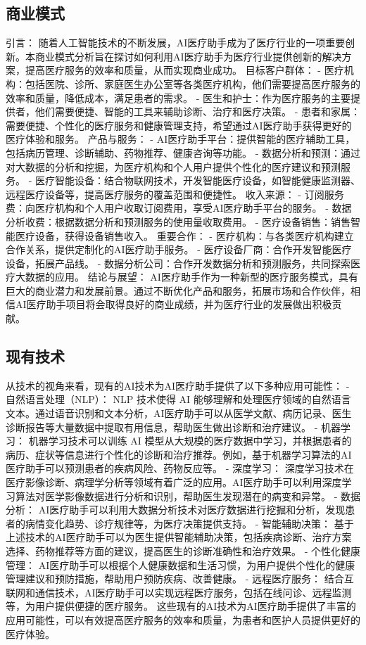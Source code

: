 \subsection{商业模式}
引言：
随着人工智能技术的不断发展，AI医疗助手成为了医疗行业的一项重要创新。本商业模式分析旨在探讨如何利用AI医疗助手为医疗行业提供创新的解决方案，提高医疗服务的效率和质量，从而实现商业成功。
目标客户群体：
- 医疗机构：包括医院、诊所、家庭医生办公室等各类医疗机构，他们需要提高医疗服务的效率和质量，降低成本，满足患者的需求。
- 医生和护士：作为医疗服务的主要提供者，他们需要便捷、智能的工具来辅助诊断、治疗和医疗决策。
- 患者和家属：需要便捷、个性化的医疗服务和健康管理支持，希望通过AI医疗助手获得更好的医疗体验和服务。
产品与服务：
- AI医疗助手平台：提供智能的医疗辅助工具，包括病历管理、诊断辅助、药物推荐、健康咨询等功能。
- 数据分析和预测：通过对大数据的分析和挖掘，为医疗机构和个人用户提供个性化的医疗建议和预测服务。
- 医疗智能设备：结合物联网技术，开发智能医疗设备，如智能健康监测器、远程医疗设备等，提高医疗服务的覆盖范围和便捷性。
收入来源：
- 订阅服务费：向医疗机构和个人用户收取订阅费用，享受AI医疗助手平台的服务。
- 数据分析收费：根据数据分析和预测服务的使用量收取费用。
- 医疗设备销售：销售智能医疗设备，获得设备销售收入。
重要合作：
- 医疗机构：与各类医疗机构建立合作关系，提供定制化的AI医疗助手服务。
- 医疗设备厂商：合作开发智能医疗设备，拓展产品线。
- 数据分析公司：合作开发数据分析和预测服务，共同探索医疗大数据的应用。
结论与展望：
AI医疗助手作为一种新型的医疗服务模式，具有巨大的商业潜力和发展前景。通过不断优化产品和服务，拓展市场和合作伙伴，相信AI医疗助手项目将会取得良好的商业成绩，并为医疗行业的发展做出积极贡献。
\subsection{现有技术}
从技术的视角来看，现有的AI技术为AI医疗助手提供了以下多种应用可能性：
- 自然语言处理（NLP）： NLP 技术使得 AI 能够理解和处理医疗领域的自然语言文本。通过语音识别和文本分析，AI医疗助手可以从医学文献、病历记录、医生诊断报告等大量数据中提取有用信息，帮助医生做出诊断和治疗建议。
- 机器学习： 机器学习技术可以训练 AI 模型从大规模的医疗数据中学习，并根据患者的病历、症状等信息进行个性化的诊断和治疗推荐。例如，基于机器学习算法的AI医疗助手可以预测患者的疾病风险、药物反应等。
- 深度学习： 深度学习技术在医疗影像诊断、病理学分析等领域有着广泛的应用。AI医疗助手可以利用深度学习算法对医学影像数据进行分析和识别，帮助医生发现潜在的病变和异常。
- 数据分析： AI医疗助手可以利用大数据分析技术对医疗数据进行挖掘和分析，发现患者的病情变化趋势、诊疗规律等，为医疗决策提供支持。
- 智能辅助决策： 基于上述技术的AI医疗助手可以为医生提供智能辅助决策，包括疾病诊断、治疗方案选择、药物推荐等方面的建议，提高医生的诊断准确性和治疗效果。
- 个性化健康管理： AI医疗助手可以根据个人健康数据和生活习惯，为用户提供个性化的健康管理建议和预防措施，帮助用户预防疾病、改善健康。
- 远程医疗服务： 结合互联网和通信技术，AI医疗助手可以实现远程医疗服务，包括在线问诊、远程监测等，为用户提供便捷的医疗服务。
这些现有的AI技术为AI医疗助手提供了丰富的应用可能性，可以有效提高医疗服务的效率和质量，为患者和医护人员提供更好的医疗体验。
